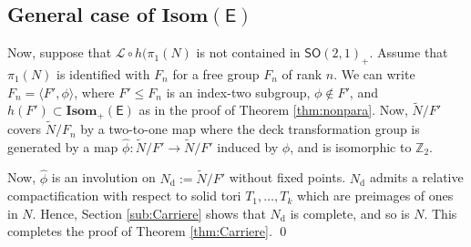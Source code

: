 \documentclass{amsart}
\numberwithin{equation}{section}
\newcommand\bZ{{\mathbb Z}}
\newcommand\ra{\rightarrow}
\newcommand\Isom{{\mathbf{Isom}}}
\newcommand\SO{{\mathsf{SO}}}
\newcommand\Lspace{\mathsf E}
\theoremstyle{definition}
\theoremstyle{remark}
\newcommand{\romel}{{\mathrm{e}, \mathrm{l}}}
\begin{document}




\subsection{General case of $\Isom(\Lspace)$} \label{sub:generalcase} 

Now, suppose that 
$\mathcal{L}\circ h(\pi_1(N)$ is not contained in $\SO(2, 1)_+$. 
Assume that $\pi_1(N)$ is identified with 
$F_n$ for a free group $F_n$ of rank $n$.
We can write $F_n=\langle F',\phi\rangle$, where $F'\le F_n$ is an index-two subgroup, 
$\phi \notin F'$, and $h(F')\subset \Isom_+(\Lspace)$
as in the proof of Theorem \ref{thm:nonpara}.
Now, $\tilde N/F'$ covers $\tilde N/F_n$ by a two-to-one map where
the deck transformation group is generated by a map 
$\hat \phi: \tilde N/F' \ra \tilde N/F'$
induced by $\phi$, and is
isomorphic to $\bZ_2$. 



Now, $\hat \phi$ is an involution 
on $N_{\mathrm d}:= \tilde N/F'$ without fixed points. 
$N_{\mathrm d}$ admits a relative compactification with respect to solid tori
$T_1, \dots, T_k$ which are preimages of ones in $N$. 
Hence, Section \ref{sub:Carriere} shows that 
$N_{\mathrm d}$ is complete, and so is $N$. 
This completes the proof of Theorem \ref{thm:Carriere}. \qed
\end{document}
